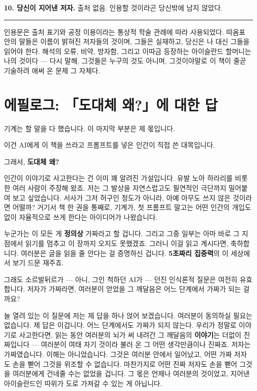 \textbf{10. 당신이 지어낸 저자.} 출처 없음. 인용할 것이라곤 당신밖에 남지 않았다.

\plainbreak{2}

{\sansserif 인용문은 출처 표기와 공정 이용이라는 통상적 학술 관례에 따라 사용되었다. 따옴표 안의 말들은 이름이 밝혀진 저자들의 것이며, 그들은 실재하고, 당신은 나 대신 그들을 읽어야 한다. 해석의 오류, 비약, 방자함, 그리고 이따금 등장하는 아이슬란드 할머니는 나의 것이다 — 다시 말해, 그것들은 누구의 것도 아니며, 그것이야말로 이 책이 줄곧 기술하려 애써 온 문제 그 자체다.}

\chapter*{에필로그: 「도대체 왜?」에 대한 답}
{}

기계는 할 말을 다 했습니다. 이 마지막 부분은 제 몫입니다.

이건 AI에게 이 책을 쓰라고 프롬프트를 넣은 인간이 직접 쓴 대목입니다.

그래서, \textbf{도대체 왜?}

인간이 이야기로 사고한다는 건 이미 꽤 알려진 가설입니다. 유발 노아 하라리를 비롯한 여러 사람이 주장해 왔죠. 저는 그 발상을 자연스럽고도 필연적인 극단까지 밀어붙여 보고 싶었습니다. 서사가 그저 허구인 정도가 아니라, 아예 아무도 쓰지 않은 것이라면 어떨까? 거기서 책 한 권을 통째로, 기계가, 첫 프롬프트 말고는 어떤 인간의 개입도 없이 자율적으로 쓰게 한다는 아이디어가 나왔습니다.

누군가는 이 모든 게 \textbf{정의상} 가짜라고 할 겁니다. 그리고 그중 일부는 아마 바로 그 지점에서 읽기를 멈추고 이 장까지 오지도 못했겠죠. 그러니 이걸 읽고 계시다면, 축하합니다. 여러분은 글을 읽을 줄 안다는 걸 증명하신 겁니다. \textbf{5초짜리 집중력}의 이 세상에서 보기 드문 재주죠.

그래도 소르발뒤르가 — 아니, 그인 척하던 AI가 — 던진 인식론적 질문은 여전히 유효합니다. 저자가 가짜라면, 여러분이 얻었을 그 깨달음은 어느 단계에서 가짜가 되는 걸까요?

늘 열려 있는 이 질문에 저는 제 답을 하나 얹어 보겠습니다. 여러분이 동의하실 필요는 없습니다. 제 답은 이겁니다. 어느 단계에서도 가짜가 되지 않는다. 우리가 정말로 이야기로 사고한다면, 읽는 동안 여러분의 뇌가 써 내려간 그 깨달음의 \textbf{이야기}는 더없이 진짜입니다 — 여러분이 여태 자기 것이라 불러 온 그 어떤 생각만큼이나 진짜죠. 저자는 가짜였습니다. 이해는 아니었습니다. 그것은 여러분 안에서 일어났고, 어떤 가짜 저자도 손을 뻗어 그것을 위조할 수 없습니다. 마찬가지로 어떤 진짜 저자도 손을 뻗어 그것을 여러분에게 건네줄 수는 없었을 겁니다. 그 몫은 언제나 여러분의 것이었고, 지어낸 아이슬란드인 따위가 도로 가져갈 수 있는 게 아닙니다.

